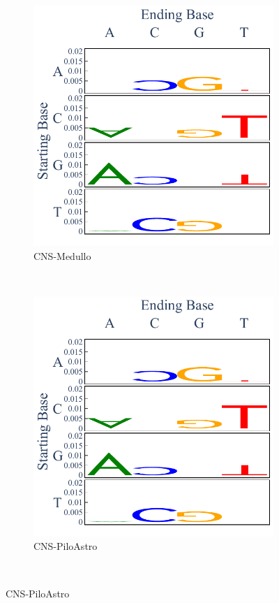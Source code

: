\begin{figure}[ht!]
    \begin{subfigure}{.5\textwidth}
    \centering
    \includegraphics[scale=0.45]{graphics/spectra_CNS-Medullo.pdf}
    \caption{CNS-Medullo}
    \end{subfigure}
    ~
    \begin{subfigure}{.5\textwidth}
    \centering
    \includegraphics[scale=0.45]{graphics/spectra_CNS-PiloAstro.pdf}
    \caption{CNS-PiloAstro}
    \end{subfigure} \\
    

\end{figure}
